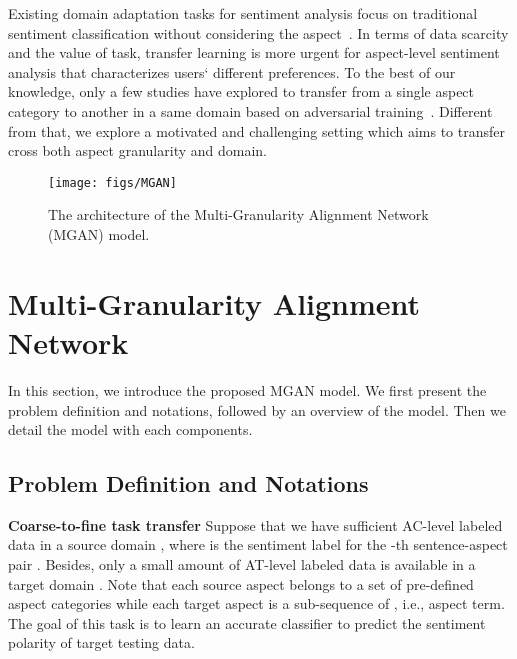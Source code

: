 \documentclass[letterpaper]{article} \usepackage{aaai19}  \usepackage{times}  \usepackage{latexsym}
\begin{document}
Existing domain adaptation tasks for sentiment analysis focus on traditional sentiment classification without considering the aspect~\cite{blitzer2007biographies,pan2010cross,glorot2011domain,chen2012marginalized,bollegala2013cross,yu2016learning,li2017end,li2018hatn}. In terms of data scarcity and the value of task, transfer learning is more urgent for aspect-level sentiment analysis that characterizes users` different preferences. To the best of our knowledge, only a few studies have explored to transfer from a single aspect category to another in a same domain based on adversarial training~\cite{zhang2017aspect}. Different from that, we explore a motivated and challenging setting which aims to transfer cross both aspect granularity and domain. 


\begin{figure*}[thb!]
\centering
\texttt{[image: figs/MGAN]}
\vspace{-3mm}
\caption{The architecture of the Multi-Granularity Alignment Network (MGAN) model.}
\vspace{-4mm}
\label{fig:overall}
\end{figure*}

\section{Multi-Granularity Alignment Network} 
In this section, we introduce the proposed MGAN model. We first present the problem definition and notations, followed by an overview of the model. Then we detail the model with each components.

\vspace{-0.5mm}
\subsection{Problem Definition and Notations}
\noindent \textbf{Coarse-to-fine task transfer}
Suppose that we have sufficient AC-level labeled data  in a source domain , where  is the sentiment  label for the -th sentence-aspect pair  . Besides, only a small amount of AT-level labeled data  is available in a target domain . Note that each source aspect  belongs to a set of pre-defined aspect categories  while each target aspect  is a sub-sequence of , i.e., aspect term. The goal of this task is to learn an accurate classifier to predict the sentiment polarity of target testing data. 
\end{document}
